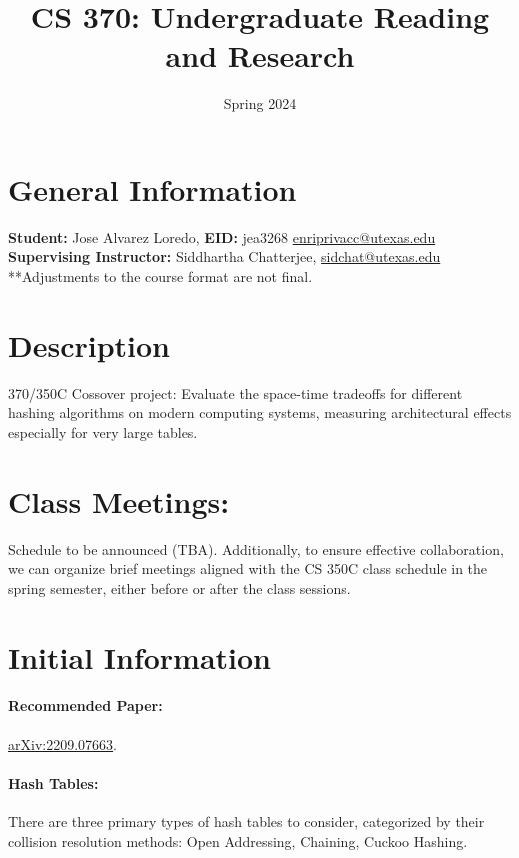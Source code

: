 \documentclass[11pt]{article}
\title{CS 370: Undergraduate Reading and Research}
\author{}
\date{Spring 2024}
\begin{document}
\maketitle

\section*{General Information}
\textbf{Student:} Jose Alvarez Loredo, \textbf{EID:} jea3268
\href{mailto:enriprivacc@utexas.edu}{enriprivacc@utexas.edu} \\
\textbf{Supervising Instructor:} Siddhartha Chatterjee, \href{mailto:sidchat@utexas.edu}{sidchat@utexas.edu} \\
**Adjustments to the course format are not final.

\section*{Description}
370/350C Cossover project: Evaluate the space-time tradeoffs for different hashing algorithms on modern computing systems, measuring architectural effects especially for very large tables.

\section*{Class Meetings:} Schedule to be announced (TBA). Additionally, to ensure effective collaboration, we can organize brief meetings aligned with the CS 350C class schedule in the spring semester, either before or after the class sessions.

\section*{Initial Information}

\paragraph{Recommended Paper:} \href{https://arxiv.org/pdf/2209.07663.pdf}{arXiv:2209.07663}.

\paragraph{Hash Tables:}
There are three primary types of hash tables to consider, categorized by their collision resolution methods:
Open Addressing, Chaining, Cuckoo Hashing.
\end{document}
